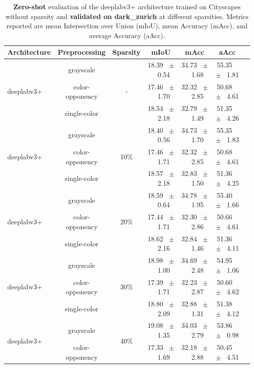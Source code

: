 \begin{table}[h]
  \centering
  \caption{\textbf{Zero-shot} evaluation of the deeplabv3+ architecture trained on Cityscapes without sparsity and \textbf{validated on dark_zurich} at different sparsities. Metrics reported are mean Intersection over Union (mIoU), mean Accuracy (mAcc), and average Accuracy (aAcc).}
  \begin{tabular}{@{}lccc ccc@{}}
    \toprule
    Architecture & Preprocessing & Sparsity & mIoU & mAcc & aAcc \\
    \midrule
    \multirow{3}{*}{deeplabv3+} & grayscale & \multirow{3}{*}{-} & 18.39 ~$\pm$~ 0.54 & 34.73 ~$\pm$~ 1.68 & 55.35 ~$\pm$~ 1.81 \\
    & color-opponency &  & 17.46 ~$\pm$~ 1.70 & 32.32 ~$\pm$~ 2.85 & 50.68 ~$\pm$~ 4.61 \\
    & single-color &  & 18.54 ~$\pm$~ 2.18 & 32.79 ~$\pm$~ 1.49 & 51.35 ~$\pm$~ 4.26 \\
    \midrule
    \multirow{3}{*}{deeplabv3+} & grayscale & \multirow{3}{*}{10\%} & 18.40 ~$\pm$~ 0.56 & 34.73 ~$\pm$~ 1.70 & 55.35 ~$\pm$~ 1.83 \\
    & color-opponency &  & 17.46 ~$\pm$~ 1.71 & 32.32 ~$\pm$~ 2.85 & 50.68 ~$\pm$~ 4.61 \\
    & single-color &  & 18.57 ~$\pm$~ 2.18 & 32.83 ~$\pm$~ 1.50 & 51.36 ~$\pm$~ 4.25 \\
    \midrule
    \multirow{3}{*}{deeplabv3+} & grayscale & \multirow{3}{*}{20\%} & 18.59 ~$\pm$~ 0.64 & 34.78 ~$\pm$~ 1.95 & 55.40 ~$\pm$~ 1.66 \\
    & color-opponency &  & 17.44 ~$\pm$~ 1.71 & 32.30 ~$\pm$~ 2.86 & 50.66 ~$\pm$~ 4.61 \\
    & single-color &  & 18.62 ~$\pm$~ 2.16 & 32.84 ~$\pm$~ 1.46 & 51.36 ~$\pm$~ 4.11 \\
    \midrule
    \multirow{3}{*}{deeplabv3+} & grayscale & \multirow{3}{*}{30\%} & 18.98 ~$\pm$~ 1.00 & 34.69 ~$\pm$~ 2.48 & 54.95 ~$\pm$~ 1.06 \\
    & color-opponency &  & 17.39 ~$\pm$~ 1.71 & 32.23 ~$\pm$~ 2.87 & 50.60 ~$\pm$~ 4.62 \\
    & single-color &  & 18.80 ~$\pm$~ 2.09 & 32.88 ~$\pm$~ 1.31 & 51.38 ~$\pm$~ 4.12 \\
    \midrule
    \multirow{3}{*}{deeplabv3+} & grayscale & \multirow{3}{*}{40\%} & 19.08 ~$\pm$~ 1.35 & 34.03 ~$\pm$~ 2.79 & 53.86 ~$\pm$~ 0.98 \\
    & color-opponency &  & 17.33 ~$\pm$~ 1.69 & 32.18 ~$\pm$~ 2.88 & 50.45 ~$\pm$~ 4.51 \\

\end{tabular}
\end{table}
